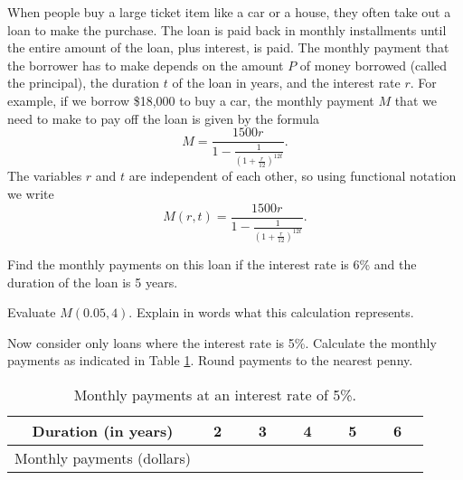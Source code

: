 \begin{pa} \label{PA:9.1} When people buy a large ticket item like a
  car or a house, they often take out a loan to make the purchase. The
  loan is paid back in monthly installments until the entire amount of
  the loan, plus interest, is paid. The monthly payment that the
  borrower has to make depends on the amount $P$ of money borrowed
  (called the principal), the duration $t$ of the loan in years, and
  the interest rate $r$. For example, if we borrow \$18,000 to buy a
  car, the monthly payment $M$ that we need to make to pay off the
  loan is given by the formula
\[M = \frac{1500r}{1-\frac{1}{\left(1+\frac{r}{12}\right)^{12t}}}.\]
The variables $r$ and $t$ are independent of each other, so using functional notation we write
\[M(r,t) = \frac{1500r}{1-\frac{1}{\left(1+\frac{r}{12}\right)^{12t}}}.\]
    \ba
    \item Find the monthly payments on this loan if the interest rate is 6\% and the duration of the loan is 5 years.

    \item Evaluate $M(0.05, 4)$. Explain in words what this calculation represents.

\item Now consider only loans where the interest rate is
  5\%. Calculate the monthly payments as indicated in Table
  \ref{T:9.1.Payments_1}. Round payments to the nearest penny.
    \begin{table}[ht]
    \begin{center}
    \renewcommand{\arraystretch}{1.5}
    \begin{tabular}{|c|c|c|c|c|c|} \hline
    Duration (in years)  &\ 2 \    & \ 3 \     & \ 4 \     & \ 5 \    & \ 6 \  \\ \hline
    Monthly payments (dollars)    & \hspace*{0.55in}  &
    \hspace*{0.55in} & \hspace*{0.55in} & \hspace*{0.55in} &
    \hspace*{0.55in} \\ \hline  
    \end{tabular}
    \caption{Monthly payments at an interest rate of 5\%.}
    \label{T:9.1.Payments_1}
    \end{center}
    \end{table}


\end{pa}

